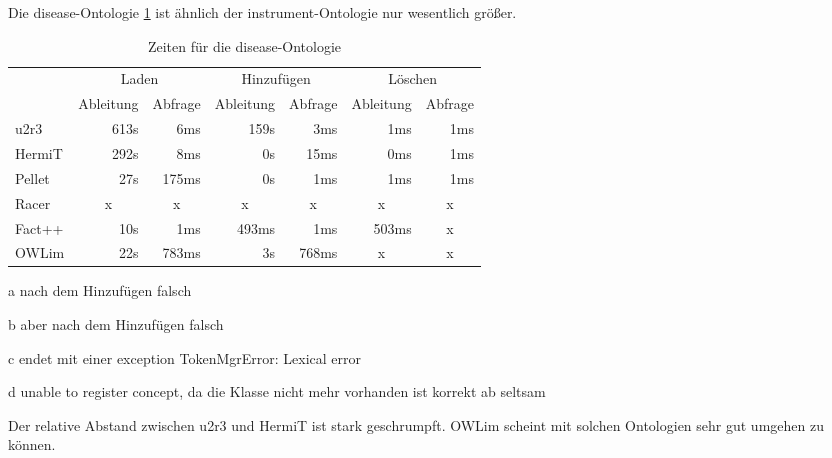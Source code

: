 Die disease-Ontologie \ref{table-time-disease} ist ähnlich der instrument-Ontologie nur wesentlich größer.
\begin{table}[htbp]
\caption{Zeiten für die disease-Ontologie}
\label{table-time-disease}
\begin{center}
\begin{threeparttable}
\begin{tabular}{l|r|r|r|r|r|r|}
\cline{2-7}
 & \multicolumn{2}{|c|}{Laden} & \multicolumn{2}{|c|}{Hinzufügen} & \multicolumn{2}{|c|}{Löschen} \\
\cline{2-7}
 & \multicolumn{1}{|c|}{Ableitung} & \multicolumn{1}{|c|}{Abfrage} & \multicolumn{1}{|c|}{Ableitung} & \multicolumn{1}{|c|}{Abfrage} & \multicolumn{1}{|c|}{Ableitung} & \multicolumn{1}{|c|}{Abfrage} \\
\hline
\multicolumn{1}{|l|}{u2r3} & 613s & 6ms & 159s & 3ms & 1ms & 1ms \\ \hline
\multicolumn{1}{|l|}{HermiT\tnote{a}} & 292s & 8ms & 0s & 15ms & 0ms & 1ms \\ \hline
\multicolumn{1}{|l|}{Pellet\tnote{b}} & 27s & 175ms & 0s & 1ms & 1ms & 1ms \\ \hline
\multicolumn{1}{|l|}{Racer\tnote{c}} & \multicolumn{1}{c|}{x} & \multicolumn{1}{c|}{x} & \multicolumn{1}{c|}{x} & \multicolumn{1}{c|}{x} & \multicolumn{1}{c|}{x} & \multicolumn{1}{c|}{x} \\ \hline
\multicolumn{1}{|l|}{Fact++\tnote{d}} & 10s & 1ms & 493ms & 1ms & 503ms & \multicolumn{1}{c|}{x} \\ \hline
\multicolumn{1}{|l|}{OWLim} & 22s & 783ms & 3s & 768ms & \multicolumn{1}{c|}{x} & \multicolumn{1}{c|}{x} \\ \hline
\end{tabular}
\begin{tablenotes}
	\item[a] nach dem Hinzufügen falsch
	\item[b] aber nach dem Hinzufügen falsch
	\item[c] endet mit einer exception TokenMgrError: Lexical error
	\item[d] unable to register concept, da die Klasse nicht mehr vorhanden ist korrekt ab seltsam
\end{tablenotes}
\end{threeparttable}
\end{center}
\end{table}

Der relative Abstand zwischen u2r3 und HermiT ist stark geschrumpft. OWLim scheint mit solchen Ontologien sehr gut umgehen zu können.

